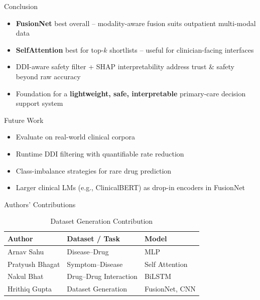 \begin{frame}{Conclusion}
    \begin{itemize}
        \item \textbf{FusionNet} best overall -- modality-aware fusion suits outpatient multi-modal data
        \item \textbf{SelfAttention} best for top-$k$ shortlists -- useful for clinician-facing interfaces
            \pause
        \item DDI-aware safety filter + SHAP interpretability address trust \& safety beyond raw accuracy
            \pause
        \item Foundation for a \textbf{lightweight, safe, interpretable} primary-care decision support system
    \end{itemize}
\end{frame}

\begin{frame}{Future Work}
    \begin{itemize}
        \item Evaluate on real-world clinical corpora
        \item Runtime DDI filtering with quantifiable rate reduction
        \item Class-imbalance strategies for rare drug prediction
        \item Larger clinical LMs (e.g., ClinicalBERT) as drop-in encoders in FusionNet
    \end{itemize}
\end{frame}

\begin{frame}{Authors' Contributions}

    \begin{table}
        \caption{Dataset Generation Contribution}
\begin{tabular}{lll}
\toprule
Author & Dataset / Task & Model \\
\midrule
Arnav Sahu & Disease--Drug & MLP \\
Pratyush Bhagat & Symptom--Disease & Self Attention \\
Nakul Bhat & Drug--Drug Interaction & BiLSTM \\
Hrithiq Gupta & Dataset Generation & FusionNet, CNN \\
\bottomrule
\end{tabular}
    \end{table}

\end{frame}
